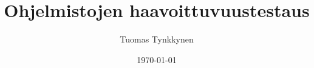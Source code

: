 \documentclass[finnish]{tktltiki2/tktltiki2}
\title{Ohjelmistojen haavoittuvuustestaus}
\author{Tuomas Tynkkynen}
\date{\today}
\theoremstyle{definition}
\theoremstyle{remark}
\begin{document}


\frontmatter      %
\maketitle        %
\makeabstract     %

\tableofcontents  %


\mainmatter


%
%
% 
%

% 
% 



\end{document}

